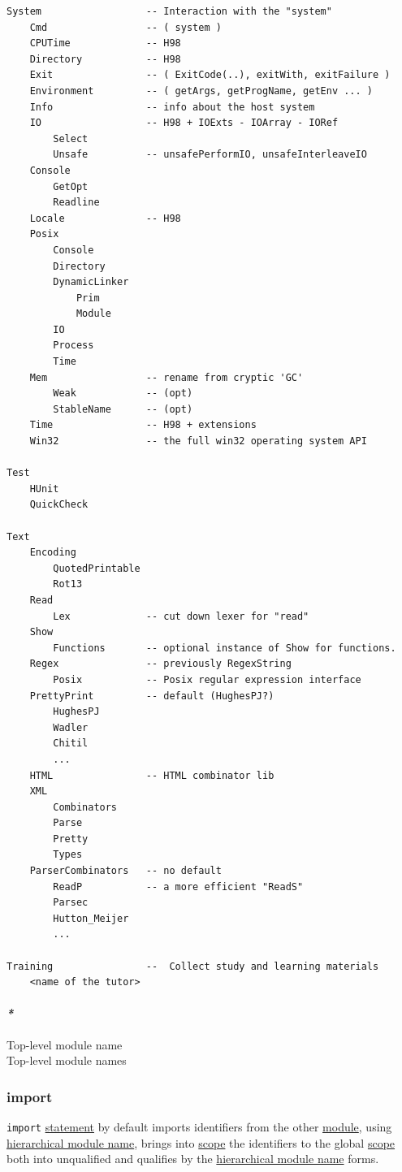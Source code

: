 \documentclass[11pt]{article}
\begin{document}
\begin{verbatim}
System                  -- Interaction with the "system"
    Cmd                 -- ( system )
    CPUTime             -- H98
    Directory           -- H98
    Exit                -- ( ExitCode(..), exitWith, exitFailure )
    Environment         -- ( getArgs, getProgName, getEnv ... )
    Info                -- info about the host system
    IO                  -- H98 + IOExts - IOArray - IORef
        Select
        Unsafe          -- unsafePerformIO, unsafeInterleaveIO
    Console
        GetOpt
        Readline
    Locale              -- H98
    Posix
        Console
        Directory
        DynamicLinker
            Prim
            Module
        IO
        Process
        Time
    Mem                 -- rename from cryptic 'GC'
        Weak            -- (opt)
        StableName      -- (opt)
    Time                -- H98 + extensions
    Win32               -- the full win32 operating system API

Test
    HUnit
    QuickCheck

Text
    Encoding
        QuotedPrintable
        Rot13
    Read
        Lex             -- cut down lexer for "read"
    Show
        Functions       -- optional instance of Show for functions.
    Regex               -- previously RegexString
        Posix           -- Posix regular expression interface
    PrettyPrint         -- default (HughesPJ?)
        HughesPJ
        Wadler
        Chitil
        ...
    HTML                -- HTML combinator lib
    XML
        Combinators
        Parse
        Pretty
        Types
    ParserCombinators   -- no default
        ReadP           -- a more efficient "ReadS"
        Parsec
        Hutton_Meijer
        ...

Training                --  Collect study and learning materials
    <name of the tutor>
\end{verbatim}

\paragraph{\emph{*}}
\label{sec:org72ff671}
\label{orgeba9d0a}Top-level module name\\
\label{orgd1aa17c}Top-level module names\\

\subsubsection{\label{org7d67aa0}import}
\label{sec:orgfdc231e}
\texttt{import} \hyperref[org0fdd00d]{statement} by default imports identifiers from the other \hyperref[orgde475c6]{module}, using \hyperref[orgf2e653a]{hierarchical module name}, brings into \hyperref[orga4eed83]{scope} the identifiers to the global \hyperref[orga4eed83]{scope} both into unqualified and qualifies by the \hyperref[orgf2e653a]{hierarchical module name} forms.\\
\end{document}
